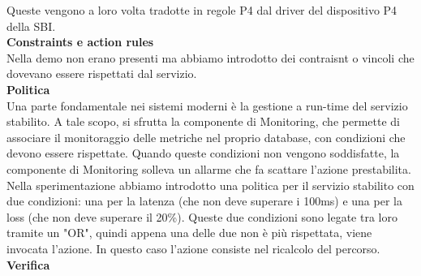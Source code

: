 Queste vengono a loro volta tradotte in regole P4 dal driver del dispositivo P4 della SBI.
\\\textbf{Constraints e action rules}
\\Nella demo non erano presenti ma abbiamo introdotto dei contraisnt o vincoli che dovevano essere rispettati dal servizio.
\\\textbf{Politica}
\\Una parte fondamentale nei sistemi moderni è la gestione a run-time del servizio stabilito.
A tale scopo, si sfrutta la componente di Monitoring, che permette di associare il monitoraggio delle metriche nel proprio database,
con condizioni che devono essere rispettate.
Quando queste condizioni non vengono soddisfatte, la componente di Monitoring solleva un allarme che fa scattare l'azione prestabilita.
\\Nella sperimentazione abbiamo introdotto una politica per il servizio stabilito con due condizioni: una per la latenza (che non deve superare i 100ms) e una per la loss (che non deve superare il 20\%).
Queste due condizioni sono legate tra loro tramite un "OR", quindi appena una delle due non è più rispettata, viene invocata l'azione.
In questo caso l'azione consiste nel ricalcolo del percorso.
\\\textbf{Verifica}

